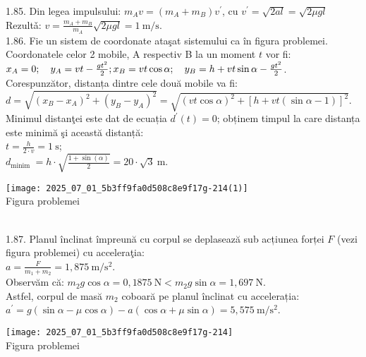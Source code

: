 1.85. Din legea impulsului: $m_{A} v=\left(m_{A}+m_{B}\right) v^{\prime}$, cu $v^{\prime}=\sqrt{2 a l}=\sqrt{2 \mu g l}$\\ Rezultǎ: $v=\frac{m_{A}+m_{B}}{m_{A}} \sqrt{2 \mu g l}=1 \mathrm{~m} / \mathrm{s}$.\\

1.86. Fie un sistem de coordonate ataşat sistemului ca în figura problemei. Coordonatele celor 2 mobile, A respectiv B la un moment $t$ vor fi:\\ $x_{A}=0; \quad y_{A}=v t-\frac{g t^{2}}{2};\\ x_{B}=v t \cos \alpha; \quad y_{B}=h+v t \sin \alpha-\frac{g t^{2}}{2}$.\\ Corespunzător, distanța dintre cele două mobile va fi:\\ $d=\sqrt{\left(x_{B}-x_{A}\right)^{2}+\left(y_{B}-y_{A}\right)^{2}}=\sqrt{(v t \cos \alpha)^{2}+[h+v t(\sin \alpha-1)]^{2}}$.\\ Minimul distanţei este dat de ecuația $d^{\prime}(t)=0$; obținem timpul la care distanța este minimă şi această distanță:\\ $t=\frac{h}{2 \cdot v}=1 \mathrm{~s}$;\\ $d_{\text {minim }}=h \cdot \sqrt{\frac{1+\sin (\alpha)}{2}}=20 \cdot \sqrt{3} \mathrm{~m}$.\\ \begin{center} \texttt{[image: 2025\_07\_01\_5b3ff9fa0d508c8e9f17g-214(1)]}\\ Figura problemei \end{center}\\

1.87. Planul înclinat împreună cu corpul se deplasează sub acțiunea forței $F$ (vezi figura problemei) cu acceleraţia:\\ $a=\frac{F}{m_{1}+m_{2}}=1,875 \mathrm{~m} / \mathrm{s}^{2}$.\\ Observăm că: $m_{2} g \cos \alpha=0,1875 \mathrm{~N}<m_{2} g \sin \alpha=1,697 \mathrm{~N}$.\\ Astfel, corpul de masă $m_{2}$ coboară pe planul înclinat cu accelerația:\\ $a^{\prime}=g(\sin \alpha-\mu \cos \alpha)-a(\cos \alpha+\mu \sin \alpha)=5,575 \mathrm{~m} / \mathrm{s}^{2}$.\\ \begin{center} \texttt{[image: 2025\_07\_01\_5b3ff9fa0d508c8e9f17g-214]}\\ Figura problemei \end{center}\\ 

